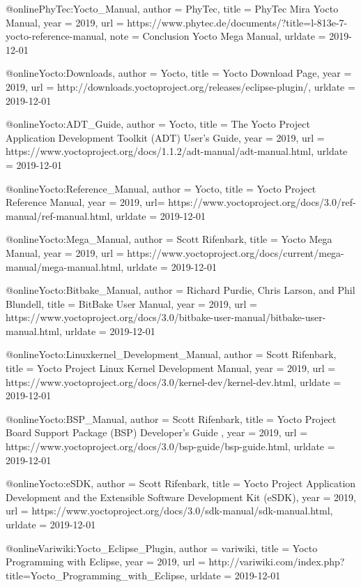 @online{PhyTec:Yocto_Manual,
author = {PhyTec},
title = {{PhyTec Mira} Yocto Manual},
year = 2019,
url = {https://www.phytec.de/documents/?title=l-813e-7-yocto-reference-manual},
note = {Conclusion Yocto Mega Manual},
urldate = {2019-12-01}
}



@online{Yocto:Downloads,
author = {Yocto},
title = {{Yocto} Download Page},
year = 2019,
url = {http://downloads.yoctoproject.org/releases/eclipse-plugin/},
urldate = {2019-12-01}
}


@online{Yocto:ADT_Guide,
author = {Yocto},
title = {The Yocto Project Application Development Toolkit (ADT) User's Guide},
year = 2019,
url = {https://www.yoctoproject.org/docs/1.1.2/adt-manual/adt-manual.html},
urldate = {2019-12-01}
}


@online{Yocto:Reference_Manual,
author = {Yocto},
title = {Yocto Project Reference Manual},
year = 2019,
url= {https://www.yoctoproject.org/docs/3.0/ref-manual/ref-manual.html},
urldate = {2019-12-01}
}


@online{Yocto:Mega_Manual,
author = {Scott Rifenbark},
title = {Yocto Mega Manual},
year = 2019,
url = {https://www.yoctoproject.org/docs/current/mega-manual/mega-manual.html},
urldate = {2019-12-01}
}


@online{Yocto:Bitbake_Manual,
author = {Richard Purdie, Chris Larson, and Phil Blundell},
title = {BitBake User Manual},
year = 2019,
url = {https://www.yoctoproject.org/docs/3.0/bitbake-user-manual/bitbake-user-manual.html},
urldate = {2019-12-01}
}

@online{Yocto:Linuxkernel_Development_Manual,
author = {Scott Rifenbark},
title = {Yocto Project Linux Kernel Development Manual},
year = 2019,
url = {https://www.yoctoproject.org/docs/3.0/kernel-dev/kernel-dev.html},
urldate = {2019-12-01}
}


@online{Yocto:BSP_Manual,
author = {Scott Rifenbark},
title = {Yocto Project Board Support Package (BSP) Developer's Guide },
year = 2019,
url = {https://www.yoctoproject.org/docs/3.0/bsp-guide/bsp-guide.html},
urldate = {2019-12-01}
}

@online{Yocto:eSDK,
author = {Scott Rifenbark},
title = {Yocto Project Application Development and the Extensible Software Development Kit (eSDK)},
year = 2019,
url = {https://www.yoctoproject.org/docs/3.0/sdk-manual/sdk-manual.html},
urldate = {2019-12-01}
}

@online{Variwiki:Yocto_Eclipse_Plugin,
author = {variwiki},
title = {Yocto Programming with Eclipse},
year = 2019,
url = {http://variwiki.com/index.php?title=Yocto_Programming_with_Eclipse},
urldate = {2019-12-01}
}

